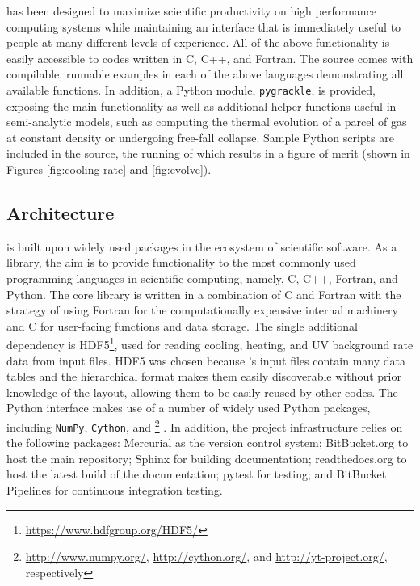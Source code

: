 \grackle{} has been designed to maximize scientific productivity on
high performance computing systems while maintaining an interface that
is immediately useful to people at many different levels of
experience.
All of the above functionality is easily accessible to codes written
in C, C++, and Fortran.  The \grackle{} source comes with compilable,
runnable examples in each of the above languages demonstrating all
available functions.  In addition, a Python module, \texttt{pygrackle},
is provided, exposing the main functionality as well as additional helper
functions useful in semi-analytic models, such as computing the
thermal evolution of a parcel of gas at constant density or undergoing
free-fall collapse.  Sample Python scripts are included in the source,
the running of which results in a figure of merit (shown in Figures
\ref{fig:cooling-rate} and \ref{fig:evolve}).

\subsection{\grackle{} Architecture}

\grackle{} is built upon widely used packages in the ecosystem of
scientific software.  As a library, the aim is to provide
functionality to the most commonly used programming languages in
scientific computing, namely, C, C++, Fortran, and Python.  The core
library is written in a combination of C and Fortran with the strategy
of using Fortran for the computationally expensive internal machinery
and C for user-facing functions and data storage.  The single
additional dependency is
HDF5\footnote{\url{https://www.hdfgroup.org/HDF5/}}, used for reading
cooling, heating,
and UV background rate data from input files.  HDF5 was chosen because
\grackle{}'s input files contain many data tables and the hierarchical
format makes them easily discoverable without prior knowledge of the
layout, allowing them to be easily reused by other codes.  The Python
interface makes use of a number of widely used Python packages, including
\texttt{NumPy}, \texttt{Cython}, and
\yt{}\footnote{\url{http://www.numpy.org/}, \url{http://cython.org/},
  and \url{http://yt-project.org/}, respectively} \citep[][an SI2-funded
project]{2011ApJS..192....9T}.  In
addition, the project infrastructure relies on the following packages:
Mercurial as the version control system; BitBucket.org to host the
main repository; Sphinx for building documentation; readthedocs.org to
host the latest build of the documentation; pytest for testing; and BitBucket
Pipelines for continuous integration testing.

